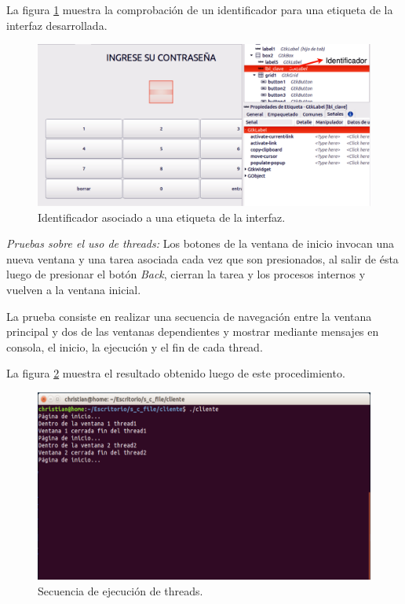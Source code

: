 La figura \ref{fig:labelid} muestra la comprobación de un identificador para una etiqueta de la interfaz desarrollada.

\begin{figure}[H]
	\centering
	\includegraphics[scale=.22]{./Figures/labelid.pdf}
	\caption{Identificador asociado a una etiqueta de la interfaz.}
	\label{fig:labelid}
\end{figure}

\textit{Pruebas sobre el uso de threads:} Los botones de la ventana de inicio invocan una nueva ventana y una tarea asociada cada vez que son presionados, al salir de ésta luego de presionar el botón \textit{Back}, cierran la tarea y los procesos internos y vuelven a la ventana inicial.

La prueba consiste en realizar una secuencia de navegación entre la ventana principal y dos de las ventanas dependientes y mostrar mediante mensajes en consola, el inicio, la ejecución y el fin de cada thread. 

La figura \ref{fig:thread} muestra el resultado obtenido luego de este procedimiento.

\begin{figure}[H]
	\centering
	\includegraphics[scale=.3]{./Figures/thread.png}
	\caption{Secuencia de ejecución de threads.}
	\label{fig:thread}
\end{figure}

